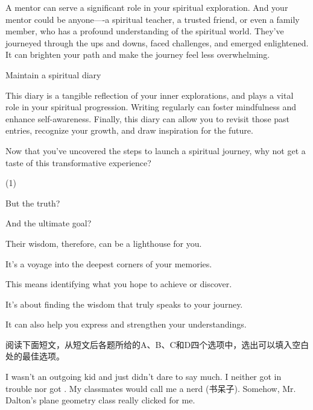 \documentclass{英语试卷}
\begin{document}
\par A mentor can serve a significant role in your spiritual exploration. And your mentor could be anyone----a spiritual teacher, a trusted friend, or even a family member, who has a profound understanding of the spiritual world. They've journeyed through the ups and downs, faced challenges, and emerged enlightened.  It can brighten your path and make the journey feel less overwhelming.\par
\par Maintain a spiritual diary\par
\par This diary is a tangible reflection of your inner explorations, and plays a vital role in your spiritual progression. Writing regularly can foster mindfulness and enhance self-awareness.  Finally, this diary can allow you to revisit those past entries, recognize your growth, and draw inspiration for the future.\par
\par Now that you've uncovered the steps to launch a spiritual journey, why not get a taste of this transformative experience?\par
\begin{choices}(1)
  \item But the truth?
  \item And the ultimate goal?
  \item Their wisdom, therefore, can be a lighthouse for you.
  \item It's a voyage into the deepest corners of your memories.
  \item This means identifying what you hope to achieve or discover.
  \item It's about finding the wisdom that truly speaks to your journey.
  \item It can also help you express and strengthen your understandings.
\end{choices}
\par 阅读下面短文，从短文后各题所给的A、B、C和D四个选项中，选出可以填入空白处的最佳选项。\par
\par I wasn't an outgoing kid and just didn't dare to say much. I neither got in trouble nor got . My classmates would call me a nerd (书呆子). Somehow, Mr. Dalton's plane geometry class really clicked for me.\par
\end{document}
